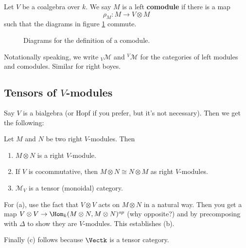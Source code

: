 \documentclass[12pt]{article}
\begin{document}
\begin{defn}
	Let $V$ be a coalgebra over $k$. We say $M$ is a left \textbf{comodule} if there is a map
	\[\rho_M:M\to V\otimes M\]
	such that the diagrams in figure \ref{fig-com} commute.
\end{defn}
\begin{figure}[h]\label{fig-com}
	\caption{Diagrams for the definition of a comodule.}
\end{figure}

\begin{rmk}
	Notationally speaking, we write $_V\mathcal{M}$ and $^V\mathcal{M}$ for the categories of 
	left modules and comodules. Similar for right boyes.
\end{rmk}

\subsection{Tensors of $V$-modules}
Say $V$ is a bialgebra (or Hopf if you prefer, but it's not necessary). Then we get the following:
\begin{lem}
	Let $M$ and $N$ be two right $V$-modules. Then
	\begin{enumerate}
		\item $M\otimes N$ is a right $V$-module.
		\item If $V$ is cocommutative, then $M\otimes N\cong N\otimes M$ as right $V$-modules.
		\item $\mathcal{M}_V$ is a tensor (monoidal) category.
	\end{enumerate}
\end{lem}
\begin{prf}
	For (a), use the fact that $V\otimes V$ acts on $M\otimes N$ in a natural way. Then you get
	a map $V\otimes V\to \Hom_k(M\otimes N,M\otimes N)^{op}$ (why opposite?) and by precomposing
	with $\Delta$ to show they are $V$-modules. This establishes (b).

	Finally (c) follows because $\Vectk$ is a tensor category.
\end{prf}
\end{document}
